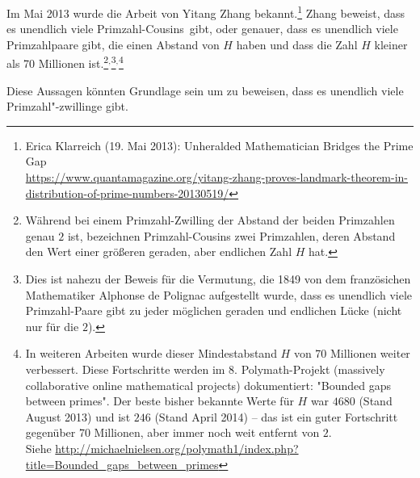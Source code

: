 \begin{refsegment}
Im Mai 2013 wurde die Arbeit von Yitang Zhang
bekannt.\footnote{%
   Erica Klarreich (19. Mai 2013): \glqq Unheralded Mathematician Bridges the
   Prime Gap\grqq \\
   \url{https://www.quantamagazine.org/yitang-zhang-proves-landmark-theorem-in-distribution-of-prime-numbers-20130519/}}
Zhang beweist, dass es unendlich viele \glqq Primzahl-Cousins\grqq~gibt, oder
genauer, dass es unendlich viele Primzahlpaare gibt, die einen Abstand von $H$
haben und dass die Zahl $H$ kleiner als 70 Millionen ist.\footnote{%
Während bei einem Primzahl-Zwilling der Abstand der beiden Primzahlen genau
$2$ ist, bezeichnen Primzahl-Cousins zwei Primzahlen,
deren Abstand den Wert einer größeren geraden, aber endlichen Zahl $H$ hat.
      }${}^,$\footnote{%
Dies ist nahezu der Beweis für die Vermutung, die 1849 von dem französichen
Mathematiker Alphonse de Polignac aufgestellt wurde, dass es unendlich viele
Primzahl-Paare gibt zu jeder möglichen geraden und endlichen Lücke (nicht nur
für die $2$).
       }${}^,$\footnote{%
In weiteren Arbeiten wurde dieser Mindestabstand $H$ von 70 Millionen
weiter verbessert. Diese Fortschritte werden im 8. Polymath-Projekt
(massively collaborative online mathematical projects) dokumentiert: "Bounded
gaps between primes". Der beste bisher bekannte Werte für $H$ war $4680$ (Stand
August 2013) und ist $246$ (Stand April 2014) -- das ist ein guter Fortschritt
gegenüber 70 Millionen, aber immer noch weit entfernt von $2$.\\
Siehe \url{http://michaelnielsen.org/polymath1/index.php?title=Bounded_gaps_between_primes}
   }

Diese Aussagen könnten Grundlage sein um zu beweisen, dass es unendlich
viele Primzahl"-zwillinge gibt.




\end{refsegment}
